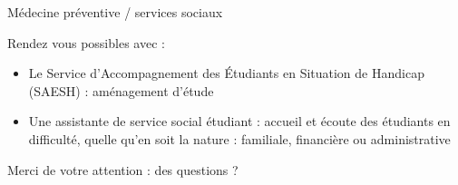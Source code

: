 \documentclass [xcolor=x11names,t] {beamer}
\begin{document}
\begin{frame}{Médecine préventive / services sociaux}
	\begin{block}{Rendez vous possibles avec :}
	\begin{itemize}
		\item Le Service d’Accompagnement des Étudiants en Situation de Handicap (SAESH) : aménagement d’étude
		\item Une assistante de service social étudiant : accueil et écoute des étudiants en difficulté, quelle qu'en soit la nature : familiale, financière ou administrative
	\end{itemize}		 
		
	\end{block}
	
	
	\begin{center}
		\LARGE
		\textcolor{myuniversity}{Merci de votre attention : des questions ?}
		
	\end{center}	
	
	
\end{frame}

%
%
\end{document}
